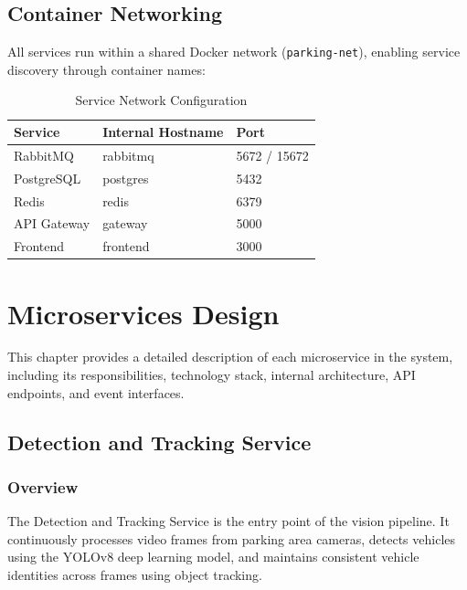 \documentclass[12pt,a4paper]{report}
\begin{document}
\section{Container Networking}

All services run within a shared Docker network (\texttt{parking-net}), enabling service discovery through container names:

\begin{table}[H]
\centering
\caption{Service Network Configuration}
\label{tab:network}
\begin{tabular}{|l|l|l|}
\hline
\textbf{Service} & \textbf{Internal Hostname} & \textbf{Port} \\
\hline
RabbitMQ & rabbitmq & 5672 / 15672 \\
\hline
PostgreSQL & postgres & 5432 \\
\hline
Redis & redis & 6379 \\
\hline
API Gateway & gateway & 5000 \\
\hline
Frontend & frontend & 3000 \\
\hline
\end{tabular}
\end{table}





\chapter{Microservices Design}

This chapter provides a detailed description of each microservice in the system, including its responsibilities, technology stack, internal architecture, API endpoints, and event interfaces.

\section{Detection and Tracking Service}

\subsection{Overview}
The Detection and Tracking Service is the entry point of the vision pipeline. It continuously processes video frames from parking area cameras, detects vehicles using the YOLOv8 deep learning model, and maintains consistent vehicle identities across frames using object tracking.
\end{document}
